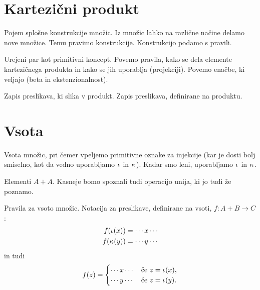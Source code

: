 


\section{Kartezični produkt}
\label{sec:kartezicni-produkt}

Pojem splošne konstrukcije množic. Iz množic lahko na različne načine delamo nove množice.
Temu pravimo konstrukcije. Konstrukcijo podamo s pravili.

Urejeni par kot primitivni koncept. Povemo pravila, kako se dela elemente kartezičnega
produkta in kako se jih uporablja (projekciji). Povemo enačbe, ki veljajo (beta in
ekstenzionalnost).

Zapis preslikava, ki slika v produkt.
Zapis preslikava, definirane na produktu.

\section{Vsota}
\label{sec:vsota}

Vsota množic, pri čemer vpeljemo primitivne oznake za injekcije (kar je dosti bolj
smiselno, kot da vedno uporabljamo $\inl$ in $\inr$). Kadar smo leni, uporabljamo $\inl$
in $\inr$.

Elementi $A + A$. Kasneje bomo spoznali tudi operacijo unija, ki jo tudi že poznamo.

Pravila za vsoto množic. Notacija za preslikave, definirane na vsoti, $f : A + B \to C$:
%
\begin{align*}
  f(\inl(x)) &= \cdots x \cdots \\
  f(\inr(y)) &= \cdots y \cdots
\end{align*}
%
in tudi
%
\begin{align*}
  f(z) =
  \begin{cases}
    \cdots x \cdots & \text{če $z = \inl(x)$,} \\
    \cdots y \cdots & \text{če $z = \inl(y)$.}
  \end{cases}
\end{align*}

